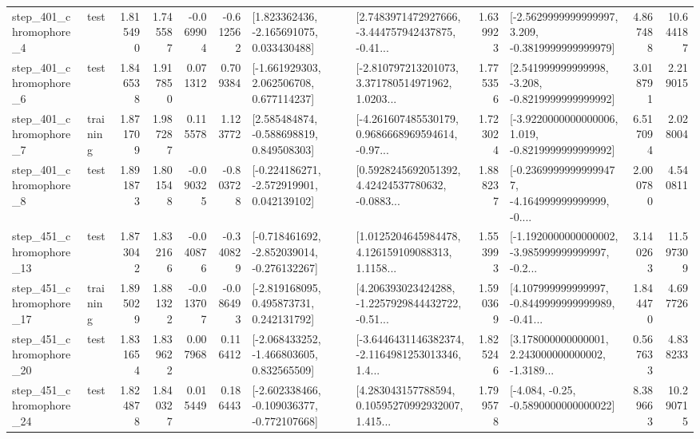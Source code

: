 \begin{tabular}{llrrrrllrlrr}
   step\_401\_chromophore\_4 &      test &      1.815490 &    1.745587 &     -0.069904 & -0.612562 &    [1.823362436, -2.165691075, 0.033430488] &  [2.7483971472927666, -3.444757942437875, -0.41... &       1.639923 &  [-2.5629999999999997, 3.209, -0.3819999999999979] &            4.867488 &         10.644187 \\
   step\_401\_chromophore\_6 &      test &      1.846538 &    1.917850 &      0.071312 &  0.709384 &    [-1.661929303, 2.062506708, 0.677114237] &  [-2.810797213201073, 3.371780514971962, 1.0203... &       1.775356 &   [2.541999999999998, -3.208, -0.8219999999999992] &            3.018791 &          2.219015 \\
   step\_401\_chromophore\_7 &  training &      1.871709 &    1.987287 &      0.115578 &  1.123772 &    [2.585484874, -0.588698819, 0.849508303] &  [-4.261607485530179, 0.9686668969594614, -0.97... &       1.723024 &  [-3.9220000000000006, 1.019, -0.8219999999999992] &            6.517094 &          2.028004 \\
   step\_401\_chromophore\_8 &      test &      1.891873 &    1.801548 &     -0.090325 & -0.803728 &   [-0.224186271, -2.572919901, 0.042139102] &  [0.5928245692051392, 4.42424537780632, -0.0883... &       1.888237 &  [-0.23699999999999477, -4.164999999999999, -0.... &            2.000780 &          4.540811 \\
  step\_451\_chromophore\_13 &      test &      1.873042 &    1.832166 &     -0.040876 & -0.340829 &  [-0.718461692, -2.852039014, -0.276132267] &  [1.0125204645984478, 4.126159109088313, 1.1158... &       1.553993 &  [-1.1920000000000002, -3.985999999999997, -0.2... &            3.140263 &         11.597309 \\
  step\_451\_chromophore\_17 &  training &      1.895029 &    1.881322 &     -0.013707 & -0.086493 &    [-2.819168095, 0.495873731, 0.242131792] &  [4.206393023424288, -1.2257929844432722, -0.51... &       1.590369 &  [4.107999999999997, -0.8449999999999989, -0.41... &            1.844470 &          4.697726 \\
  step\_451\_chromophore\_20 &      test &      1.831654 &    1.839622 &      0.007968 &  0.116412 &   [-2.068433252, -1.466803605, 0.832565509] &  [-3.6446431146382374, -2.1164981253013346, 1.4... &       1.825246 &  [3.178000000000001, 2.243000000000002, -1.3189... &            0.567633 &          4.838233 \\
  step\_451\_chromophore\_24 &      test &      1.824878 &    1.840327 &      0.015449 &  0.186443 &  [-2.602338466, -0.109036377, -0.772107668] &  [4.283043157788594, 0.10595270992932007, 1.415... &       1.799578 &               [-4.084, -0.25, -0.5890000000000022] &            8.389663 &         10.290715 \\

\end{tabular}
